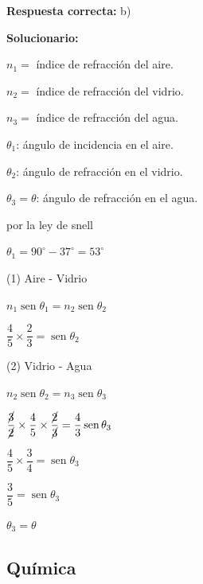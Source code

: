 \begin{enumerate}[resume]
\textbf{Respuesta correcta:} b)

\vspace{2mm}
\textbf{Solucionario:}

$n_1=$ índice de refracción del aire.

$n_2=$ índice de refracción del vidrio.

$n_3=$ índice de refracción del agua.

$\theta_1$: ángulo de incidencia en el aire.

$\theta_2$: ángulo de refracción en el vidrio.

$\theta_3=\theta$: ángulo de refracción en el agua.



por la ley de snell 

$\theta_1 = 90^\circ - 37^\circ =53^\circ $

(1) Aire - Vidrio

$n_{1}\operatorname{sen}\theta_{1}=n_{2}\operatorname{sen}\theta_{2}$

$\dfrac{4}{5}\times\dfrac{2}{3}=\operatorname{sen}\theta_{2}$

(2) Vidrio - Agua

$n_{2}\operatorname{sen}\theta_{2}=n_{3}\operatorname{sen}\theta_{3}$

$\dfrac{\cancel{3}}{\cancel{2}}\times\dfrac{4}{5}\times\dfrac{\cancel{2}}{\cancel{3}}=\dfrac{4}{3}\operatorname{sen}\theta_{3}$

$\dfrac{4}{5}\times\dfrac{3}{4}=\operatorname{sen}\theta_{3}$

$\dfrac{3}{5}=\operatorname{sen}\theta_{3}$

$\theta_{3}=\theta$

	
	
\end{enumerate}



\subsection*{Química}

